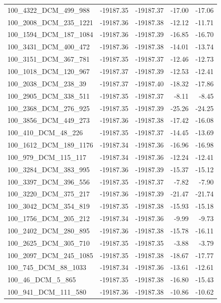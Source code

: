 \documentclass[journal=jacsat,manuscript=article]{achemso}
\begin{document}
\begin{table}[b!]
\begin{tabular}{lrrrr}
100\_4322\_DCM\_499\_988  & -19187.35 & -19187.37 &  -17.00 & -17.06 \\
100\_2008\_DCM\_235\_1221 & -19187.36 & -19187.38 &  -12.12 & -11.71 \\
100\_1594\_DCM\_187\_1084 & -19187.36 & -19187.39 &  -16.85 & -16.70 \\
100\_3431\_DCM\_400\_472  & -19187.36 & -19187.38 &  -14.01 & -13.74 \\
100\_3151\_DCM\_367\_781  & -19187.35 & -19187.37 &  -12.46 & -12.73 \\
100\_1018\_DCM\_120\_967  & -19187.37 & -19187.39 &  -12.53 & -12.41 \\
100\_2038\_DCM\_238\_39   & -19187.37 & -19187.40 &  -18.32 & -17.86 \\
100\_2905\_DCM\_338\_511  & -19187.35 & -19187.37 &   -8.11 &  -8.45 \\
100\_2368\_DCM\_276\_925  & -19187.35 & -19187.39 &  -25.26 & -24.25 \\
100\_3856\_DCM\_449\_273  & -19187.36 & -19187.38 &  -17.42 & -16.08 \\
100\_410\_DCM\_48\_226    & -19187.35 & -19187.37 &  -14.45 & -13.69 \\
100\_1612\_DCM\_189\_1176 & -19187.34 & -19187.36 &  -16.96 & -16.98 \\
100\_979\_DCM\_115\_117   & -19187.34 & -19187.36 &  -12.24 & -12.41 \\
100\_3284\_DCM\_383\_995  & -19187.36 & -19187.39 &  -15.37 & -15.12 \\
100\_3397\_DCM\_396\_556  & -19187.35 & -19187.37 &   -7.82 &  -7.90 \\
100\_3220\_DCM\_375\_217  & -19187.36 & -19187.39 &  -21.47 & -21.74 \\
100\_3042\_DCM\_354\_819  & -19187.35 & -19187.38 &  -15.93 & -15.18 \\
100\_1756\_DCM\_205\_212  & -19187.34 & -19187.36 &   -9.99 &  -9.73 \\
100\_2402\_DCM\_280\_895  & -19187.36 & -19187.38 &  -15.78 & -16.11 \\
100\_2625\_DCM\_305\_710  & -19187.35 & -19187.35 &   -3.88 &  -3.79 \\
100\_2097\_DCM\_245\_1085 & -19187.35 & -19187.38 &  -18.67 & -17.77 \\
100\_745\_DCM\_88\_1033   & -19187.34 & -19187.36 &  -13.61 & -12.61 \\
100\_46\_DCM\_5\_865      & -19187.35 & -19187.38 &  -16.80 & -15.43 \\
100\_941\_DCM\_111\_580   & -19187.36 & -19187.38 &  -10.86 & -10.62 \\

\end{tabular}
\end{table}
\end{document}
